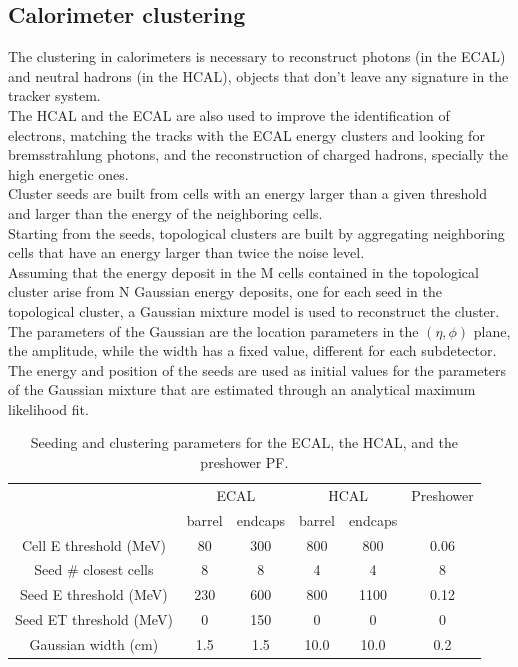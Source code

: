 \subsection{Calorimeter clustering}
The clustering in calorimeters is necessary to reconstruct photons (in the ECAL) and neutral hadrons (in the HCAL), objects that don't leave any signature in the tracker system.\\
The HCAL and the ECAL are also used to improve the identification of electrons, matching the tracks with the ECAL energy clusters and looking for bremsstrahlung photons, and the reconstruction of charged hadrons, specially the high energetic ones.\\
Cluster seeds are built from cells with an energy larger than a given threshold and
larger than the energy of the neighboring cells.\\
Starting from the seeds, topological clusters are built by aggregating neighboring cells that have an energy larger than twice the noise level.\\
Assuming that the energy deposit in the M cells contained in the topological cluster arise from N Gaussian energy deposits, one for each seed in the topological cluster, a Gaussian mixture model is used to reconstruct the cluster. The parameters of the Gaussian are the location parameters in the $(\eta,\phi)$ plane, the amplitude, while the width has a fixed value, different for each subdetector.\\
The energy and position of the seeds are used as initial values for the parameters of the Gaussian mixture that are estimated through an analytical maximum likelihood fit.\\

\begin{table}[h!]
    \centering
    \begin{tabular}{|c|cc|cc|c|}
    \hline
    &\multicolumn{2}{c|}{ECAL} & \multicolumn{2}{c|}{HCAL} & Preshower\\
    &barrel&endcaps&barrel&endcaps& \\
    \hline
    Cell E threshold (MeV)&80&300&800&800&0.06\\
    Seed \# closest cells&8&8&4&4&8\\
    Seed E threshold (MeV)&230&600&800&1100&0.12\\
    Seed ET threshold (MeV)&0&150&0&0&0\\
    Gaussian width (cm)&1.5&1.5&10.0&10.0&0.2\\
    \hline
    \end{tabular}
    \caption{Seeding and clustering parameters for the ECAL, the HCAL, and the preshower \ADDREF PF.}
    \label{tab:clustering}
\end{table}

